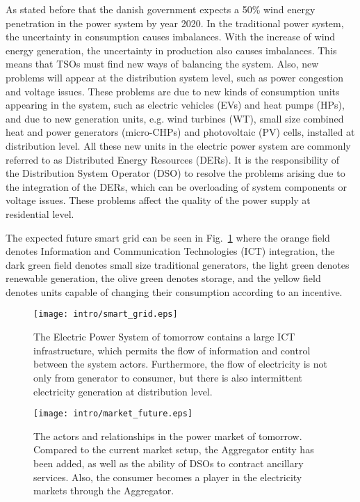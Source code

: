 As stated before that the danish government expects a 50\% wind energy penetration in the power system by year 2020. In the traditional power system, the uncertainty in consumption causes imbalances. With the increase of wind energy generation, the uncertainty in production also causes imbalances. This means that TSOs must find new ways of balancing the system. Also, new problems will appear at the distribution system level, such as power congestion and voltage issues. These problems are due to new kinds of consumption units appearing in the system, such as electric vehicles (EVs) and heat pumps (HPs), and due to new generation units, e.g. wind turbines (WT), small size combined heat and power generators (micro-CHPs) and photovoltaic (PV) cells, installed at distribution level. All these new units in the electric power system are commonly referred to as Distributed Energy Resources (DERs). It is the responsibility of the Distribution System Operator (DSO) to resolve the problems arising due to the integration of the DERs, which can be overloading of system components or voltage issues. These problems affect the quality of the power supply at residential level.

The expected future smart grid can be seen in Fig.~\ref{fig:powerfuture} where the orange field denotes Information and Communication Technologies (ICT) integration, the dark green field denotes small size traditional generators, the light green denotes renewable generation, the olive green denotes storage, and the yellow field denotes units capable of changing their consumption according to an incentive.
\begin{figure}
	\centering
	\texttt{[image: intro/smart\_grid.eps]}
	\caption{The Electric Power System of tomorrow contains a large ICT infrastructure, which permits the flow of information and control between the system actors. Furthermore, the flow of electricity is not only from generator to consumer, but there is also intermittent electricity generation at distribution level.}\label{fig:powerfuture}
\end{figure}
\begin{figure*}
	\centering
	\texttt{[image: intro/market\_future.eps]}
	\caption{The actors and relationships in the power market of tomorrow. Compared to the current market setup, the Aggregator entity has been added, as well as the ability of DSOs to contract ancillary services. Also, the consumer becomes a player in the electricity markets through the Aggregator.}\label{fig:marketfuture}
\end{figure*}

